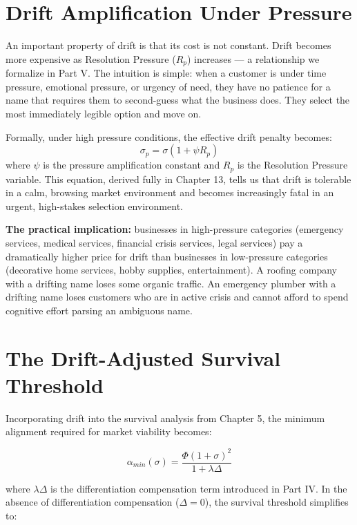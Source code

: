 \documentclass[12pt, openany]{book}
\theoremstyle{thmstyle}
\theoremstyle{defstyle}
\newcommand{\Rp}{R_p}
\begin{document}
\section{Drift Amplification Under Pressure}

An important property of drift is that its cost is not constant. Drift becomes more expensive as Resolution Pressure ($\Rp$) increases --- a relationship we formalize in Part V. The intuition is simple: when a customer is under time pressure, emotional pressure, or urgency of need, they have no patience for a name that requires them to second-guess what the business does. They select the most immediately legible option and move on.

Formally, under high pressure conditions, the effective drift penalty becomes:
\begin{equation}
\sigma_p = \sigma(1 + \psi R_p)
\label{eq:drift_pressure}
\end{equation}
where $\psi$ is the pressure amplification constant and $R_p$ is the Resolution Pressure variable. This equation, derived fully in Chapter 13, tells us that drift is tolerable in a calm, browsing market environment and becomes increasingly fatal in an urgent, high-stakes selection environment.

\textbf{The practical implication:} businesses in high-pressure categories (emergency services, medical services, financial crisis services, legal services) pay a dramatically higher price for drift than businesses in low-pressure categories (decorative home services, hobby supplies, entertainment). A roofing company with a drifting name loses some organic traffic. An emergency plumber with a drifting name loses customers who are in active crisis and cannot afford to spend cognitive effort parsing an ambiguous name.

\section{The Drift-Adjusted Survival Threshold}

Incorporating drift into the survival analysis from Chapter 5, the minimum alignment required for market viability becomes:

\begin{equation}
\alpha_{min}(\sigma) = \frac{\Phi(1+\sigma)^2}{1 + \lambda\Delta}
\label{eq:survival_drift}
\end{equation}

where $\lambda\Delta$ is the differentiation compensation term introduced in Part IV. In the absence of differentiation compensation ($\Delta = 0$), the survival threshold simplifies to:
\end{document}
